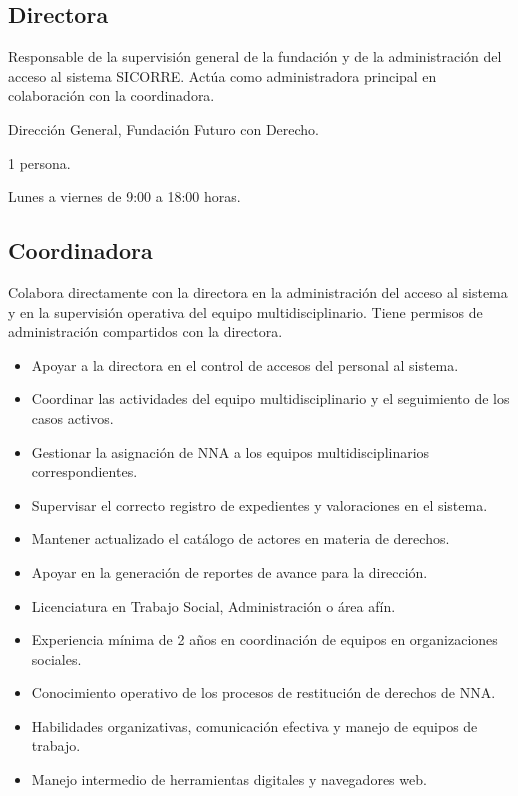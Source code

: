 \begin{Usuario}{\hypertarget{A.Directora}{\hypertarget{Actor.Administrador}{\subsection{Directora}}}}{
		Responsable de la supervisión general de la fundación y de la 
		administración del acceso al sistema SICORRE. Actúa como administradora 
		principal en colaboración con la coordinadora.
	}
	\item[Área:] Dirección General, Fundación Futuro con Derecho.
	\item[Cantidad aproximada:] 1 persona.
	\item[Horario de actividad:] Lunes a viernes de 9:00 a 18:00 horas.
\end{Usuario}

\begin{Usuario}{\hypertarget{A.Coordinadora}{\subsection{Coordinadora}}}{
		Colabora directamente con la directora en la administración del acceso 
		al sistema y en la supervisión operativa del equipo multidisciplinario. 
		Tiene permisos de administración compartidos con la directora.
	}
	\item[Responsabilidades:] \cdtEmpty
	\begin{itemize}
		\item Apoyar a la directora en el control de accesos del personal 
		al sistema.
		\item Coordinar las actividades del equipo multidisciplinario y el 
		seguimiento de los casos activos.
		\item Gestionar la asignación de NNA a los equipos 
		multidisciplinarios correspondientes.
		\item Supervisar el correcto registro de expedientes y valoraciones 
		en el sistema.
		\item Mantener actualizado el catálogo de actores en materia de 
		derechos.
		\item Apoyar en la generación de reportes de avance para la dirección.
	\end{itemize}
	
	\item[Perfil:] \cdtEmpty
	\begin{itemize}
		\item Licenciatura en Trabajo Social, Administración o área afín.
		\item Experiencia mínima de 2 años en coordinación de equipos en 
		organizaciones sociales.
		\item Conocimiento operativo de los procesos de restitución de 
		derechos de NNA.
		\item Habilidades organizativas, comunicación efectiva y manejo 
		de equipos de trabajo.
		\item Manejo intermedio de herramientas digitales y navegadores web.
	\end{itemize}
	

\end{Usuario}
